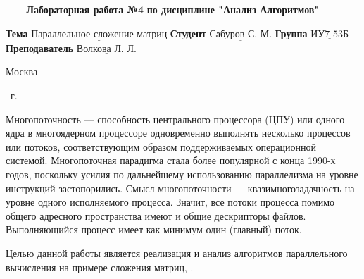 \begin{center}
	\noindent\begin{minipage}{1.3\textwidth}\centering
	\Large\textbf{   ~~~ Лабораторная работа №4}\newline
	\textbf{по дисциплине "Анализ Алгоритмов"}\newline\newline\newline
	\end{minipage}
\end{center}

\noindent\textbf{Тема} $\underline{\text{Параллельное сложение матриц}}$\newline\newline
\noindent\textbf{Студент} $\underline{\text{Сабуров С. М.}}$\newline\newline
\noindent\textbf{Группа} $\underline{\text{ИУ7-53Б}}$\newline\newline
\noindent\textbf{Преподаватель} $\underline{\text{Волкова Л. Л.}}$\newline

\begin{center}
	\mbox{}
	\vfill
	Москва
\end{center}

\begin{center}
	\the\year ~г.
\end{center}
\clearpage

\renewcommand\contentsname{\hfill{\normalfont{СОДЕРЖАНИЕ}}\hfill}  %
\tableofcontents
\newpage



Многопоточность — способность центрального процессора (ЦПУ) или
одного ядра в многоядерном процессоре одновременно выполнять несколько процессов или потоков, соответствующим образом поддерживаемых операционной системой.
Многопоточная парадигма стала более популярной с конца 1990-х годов,
поскольку усилия по дальнейшему использованию параллелизма на уровне
инструкций застопорились.
Смысл многопоточности — квазимногозадачность на уровне одного исполняемого процесса.
Значит, все потоки процесса помимо общего адресного пространства
имеют и общие дескрипторы файлов. Выполняющийся процесс имеет как
минимум один (главный) поток.




Целью данной работы является реализация и анализ алгоритмов параллельного вычисления на примере сложения матриц, .



